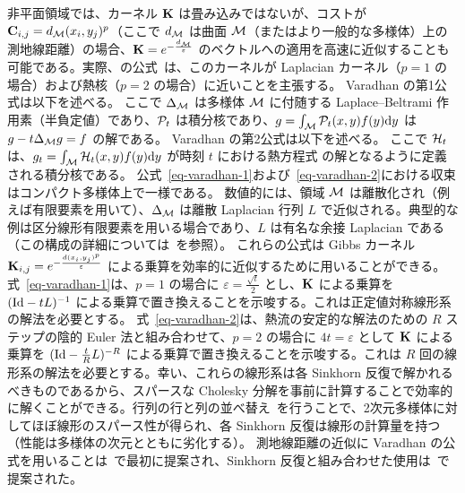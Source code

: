 \begin{rem}[熱における測地線近似]\label{rem-geod-heat}
非平面領域では、カーネル $\mathrm{\textbf{K}}$ は畳み込みではないが、コストが $\mathrm{\textbf{C}}_{i,j}=d_{\mathcal{M}}(x_i,y_j)^p$（ここで $d_{\mathcal{M}}$ は曲面 $\mathcal{M}$（またはより一般的な多様体）上の測地線距離）の場合、$\mathrm{\textbf{K}}=e^{-\frac{d_{\mathcal{M}}}{\varepsilon}}$ のベクトルへの適用を高速に近似することも可能である。実際、\citeauthor{varadhan-1967}の公式~\citeyearpar{varadhan-1967}は、このカーネルが Laplacian カーネル（$p=1$ の場合）および熱核（$p=2$ の場合）に近いことを主張する。
Varadhan の第1公式は以下を述べる。
ここで $\Delta_{\mathcal{M}}$ は多様体 $\mathcal{M}$ に付随する Laplace--Beltrami 作用素（半負定値）であり、$\mathcal{P}_t$ は積分核であり、$g = \int_{\mathcal{M}} \mathcal{P}_t(x,y) f(y) \mathrm{d} y$ は $g - t \Delta_{\mathcal{M}} g = f$ の解である。
Varadhan の第2公式は以下を述べる。
ここで $\mathcal{H}_t$ は、$g_t = \int_{\mathcal{M}} \mathcal{H}_t(x,y) f(y) \mathrm{d} y$ が時刻 $t$ における熱方程式
の解となるように定義される積分核である。
公式~\eqref{eq-varadhan-1}および~\eqref{eq-varadhan-2}における収束はコンパクト多様体上で一様である。
数値的には、領域 $\mathcal{M}$ は離散化され（例えば有限要素を用いて）、$\Delta_{\mathcal{M}}$ は離散 Laplacian 行列 $L$ で近似される。典型的な例は区分線形有限要素を用いる場合であり、$L$ は有名な余接 Laplacian である（この構成の詳細については~\citep{botsch-2010}を参照）。
これらの公式は Gibbs カーネル $\mathrm{\textbf{K}}_{i,j}=e^{-\frac{d(x_i,y_j)^p}{\varepsilon}}$ による乗算を効率的に近似するために用いることができる。
式~\eqref{eq-varadhan-1}は、$p=1$ の場合に $\varepsilon=\frac{\sqrt{t}}{2}$ とし、$\mathrm{\textbf{K}}$ による乗算を $(\mathrm{Id}-t L)^{-1}$ による乗算で置き換えることを示唆する。これは正定値対称線形系の解法を必要とする。
式~\eqref{eq-varadhan-2}は、熱流の安定的な解法のための $R$ ステップの陰的 Euler 法と組み合わせて、$p=2$ の場合に $4 t=\varepsilon$ として $\mathrm{\textbf{K}}$ による乗算を $(\mathrm{Id}-\frac{t}{R} L)^{-R}$ による乗算で置き換えることを示唆する。これは $R$ 回の線形系の解法を必要とする。幸い、これらの線形系は各 Sinkhorn 反復で解かれるべきものであるから、スパースな Cholesky 分解を事前に計算することで効率的に解くことができる。行列の行と列の並べ替え~\citep{george1989evolution}を行うことで、2次元多様体に対してほぼ線形のスパース性が得られ、各 Sinkhorn 反復は線形の計算量を持つ（性能は多様体の次元とともに劣化する）。
測地線距離の近似に Varadhan の公式を用いることは~\citep{Crane2013}で最初に提案され、Sinkhorn 反復と組み合わせた使用は~\citep{2015-solomon-siggraph}で提案された。
\end{rem}


